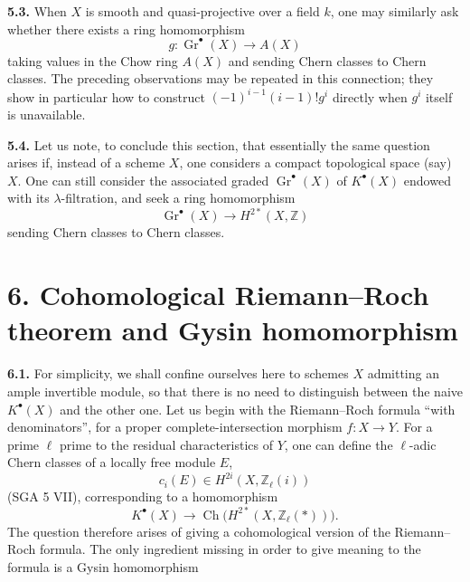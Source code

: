 \documentclass[11pt]{article}
\newcommand{\Z}{\mathbb Z}
\newcommand{\Zell}{\mathbb Z_{\ell}}
\newcommand{\Ch}{\operatorname{Ch}}
\begin{document}
\noindent\textbf{5.3.}
When $X$ is smooth and quasi-projective over a field $k$, one may similarly
ask whether there exists a ring homomorphism
\[
 g:\operatorname{Gr}^\bullet(X)\longrightarrow A(X)
\]
taking values in the Chow ring $A(X)$ and sending Chern classes to Chern
classes. The preceding observations may be repeated in this connection;
they show in particular how to construct $(-1)^{i-1}(i-1)!g^i$ directly
when $g^i$ itself is unavailable.

\noindent\textbf{5.4.}
Let us note, to conclude this section, that essentially the same question
arises if, instead of a scheme $X$, one considers a compact topological
space (say) $X$. One can still consider the associated graded
$\operatorname{Gr}^\bullet(X)$ of $K^\bullet(X)$ endowed with its
$\lambda$-filtration, and seek a ring homomorphism
\[
 \operatorname{Gr}^\bullet(X)\longrightarrow H^{2*}(X,\Z)
\]
sending Chern classes to Chern classes.

\section*{6. Cohomological Riemann--Roch theorem and Gysin homomorphism}

\noindent\textbf{6.1.}
For simplicity, we shall confine ourselves here to schemes $X$ admitting an
ample invertible module, so that there is no need to distinguish between the
naive $K^\bullet(X)$ and the other one. Let us begin with the Riemann--Roch
formula ``with denominators'', for a proper complete-intersection morphism
$f:X\longrightarrow Y$. For a prime $\ell$ prime to the residual
characteristics of $Y$, one can define the $\ell$-adic Chern classes of a
locally free module $E$,
\[
 c_i(E)\in H^{2i}(X,\Zell(i))
\]
(SGA 5 VII), corresponding to a homomorphism
\begin{equation}\tag{6.1}
 K^\bullet(X)\longrightarrow \Ch\bigl(H^{2*}(X,\Zell(*))\bigr).
\end{equation}
The question therefore arises of giving a cohomological version of the
Riemann--Roch formula. The only ingredient missing in order to give meaning
to the formula is a Gysin homomorphism
\end{document}
